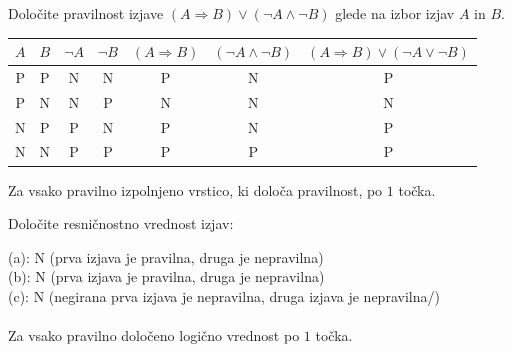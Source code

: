 \documentclass[addpoints]{exam}
\begin{document}
\begin{questions}

    
    \question[4]
    Določite pravilnost izjave $(A\Rightarrow  B)\lor (\lnot A\land \lnot B)$ glede na izbor izjav $A$ in $B$.

    \begin{solution}[8cm]
        \begin{table}[H]
        \begin{tabular}{ccccccc}
            $A$ & $B$ & $\lnot A$ & $\lnot B$ & $(A\Rightarrow B)$ & $(\lnot A\land \lnot B)$ & $(A\Rightarrow B)\lor(\lnot A\lor \lnot B)$\\ \hline
            P & P & N & N & P & N & P \\ 
            P & N & N & P & N & N & N \\
            N & P & P & N & P & N & P \\
            N & N & P & P & P & P & P
           \end{tabular}
       \end{table}
       Za vsako pravilno izpolnjeno vrstico, ki določa pravilnost, po $1$ točka.

    \end{solution}




    \question[3]
    Določite resničnostno vrednost izjav:

    \begin{solution}
        (a): N (prva izjava je pravilna, druga je nepravilna) \\
        (b): N (prva izjava je pravilna, druga je nepravilna) \\
        (c): N (negirana prva izjava je nepravilna, druga izjava je nepravilna/) \\ \\
        Za vsako pravilno določeno logično vrednost po $1$ točka.
    \end{solution}




\end{questions}
\end{document}
